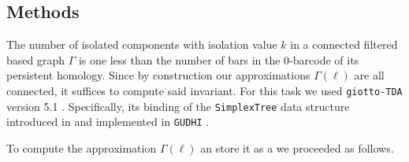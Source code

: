 \subsection{Methods}

The number of isolated components with isolation value $k$ in a connected filtered based graph $\Gamma$ is one less than the number of bars in the 0-barcode of its persistent homology.
Since by construction our approximations $\Gamma(\ell)$ are all connected, it suffices to compute said invariant.
For this task we used \texttt{giotto-TDA} version 5.1 \cite{tauzin2021giotto}.
Specifically, its binding of the \texttt{SimplexTree} data structure introduced in \cite{boissonnat2014simplex} and implemented in \texttt{GUDHI} \cite{maria2014gudhi}.

To compute the approximation $\Gamma(\ell)$ an store it as a  we proceeded as follows.
